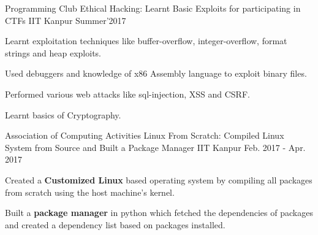 \begin{cventries}


  \cventry
    {Programming Club} %
    {Ethical Hacking: Learnt Basic Exploits for participating in CTFs} %
    {IIT Kanpur} %
    {Summer'2017} %
    {
      \begin{cvitems} %
        \item {Learnt exploitation techniques like buffer-overflow, integer-overflow, format strings and heap exploits.}
        \item {Used debuggers and knowledge of x86 Assembly language to exploit binary files.}
        \item {Performed various web attacks like sql-injection, XSS and CSRF.}
        \item {Learnt basics of Cryptography.}
      \end{cvitems}
    }



  \cventry
    {Association of Computing Activities} %
    {Linux From Scratch: Compiled Linux System from Source and Built a Package Manager} %
    {IIT Kanpur} %
    {Feb. 2017 - Apr. 2017} %
    {
      \begin{cvitems} %
        \item {Created a \textbf{Customized Linux} based operating system by compiling all packages from scratch using the host machine's kernel.}
        \item {Built a \textbf{package manager} in python which fetched the dependencies of packages and created a dependency list based on packages installed.} 
      \end{cvitems}
    }

\end{cventries}
